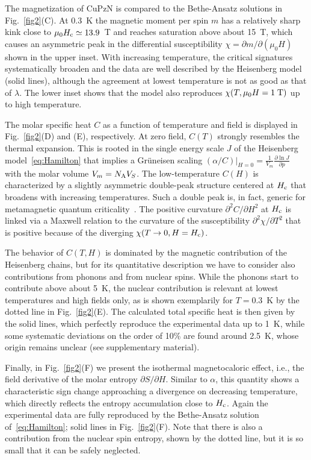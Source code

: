 \documentclass[12pt]{article}
\begin{document}
The magnetization of CuPzN is compared to the Bethe-Ansatz solutions in Fig.~\ref{fig2}(C). At 0.3~K the magnetic moment per spin $m$ has a relatively sharp kink close to $\mu_0 H_{\rm c}\simeq 13.9$~T and reaches saturation above about 15~T, which causes an asymmetric peak in the differential susceptibility $\chi = \partial m/\partial (\mu_0 H)$ shown in the upper inset. With increasing temperature, the critical signatures systematically broaden and the data are well described by the Heisenberg model (solid lines), although the agreement at lowest temperature is not as good as that of $\lambda$. The lower inset shows that the model also reproduces $\chi(T, \mu_0 H = 1\;{\rm T})$ up to high temperature.

The molar specific heat $C$ as a function of temperature and field is displayed in Fig.~\ref{fig2}(D) and (E), respectively. At zero field, $C(T)$ strongly resembles the thermal expansion. This is rooted in the single energy scale $J$ of the Heisenberg model~\eqref{eq:Hamilton} that implies a Gr\"uneisen scaling $(\alpha/C)|_{H=0} = \frac{1}{V_m} \frac{\partial \ln J}{\partial p}$ with the molar volume $V_m = N_{\rm A} V_S$. The low-temperature $C(H)$ is characterized by a slightly asymmetric double-peak structure centered at $H_{\rm c}$ that broadens with increasing temperatures. Such a double peak is, in fact, generic for metamagnetic quantum criticality~\cite{Weickert2010}. The positive curvature $\partial^2C/\partial H^2$ at $H_{\rm c}$ is linked via a Maxwell relation to the curvature of the %
susceptibility $\partial^2 \chi/\partial T^2$ that is positive because of the diverging $\chi(T\rightarrow 0, H=H_{\rm c})$. 

The behavior of $C(T,H)$ is dominated by the magnetic contribution of the Heisenberg chains, but for its quantitative description we have to consider also contributions from phonons and from nuclear spins. While the phonons start to contribute above about 5~K, the nuclear contribution is relevant at lowest temperatures and high fields only, as is shown exemplarily for $T=0.3$~K by the dotted line in Fig.~\ref{fig2}(E). The calculated total specific heat is then given by the solid lines, which perfectly reproduce the experimental data up to 1~K, while some systematic deviations on the order of 10\% are found around 2.5~K, whose origin remains unclear (see supplementary material).

Finally, in Fig.~\ref{fig2}(F) we present the isothermal magnetocaloric effect, i.e., the field derivative of the molar entropy $\partial S/\partial H$. Similar to $\alpha$, this quantity shows a characteristic sign change approaching a divergence on decreasing temperature, which directly reflects the entropy accumulation close to $H_{\rm c}$. Again the experimental data are fully reproduced by the Bethe-Ansatz solution of~\eqref{eq:Hamilton}; solid lines in Fig.~\ref{fig2}(F). Note that there is also a contribution from the nuclear spin entropy, shown by the dotted line, but it is so small that it can be safely neglected.
\end{document}
